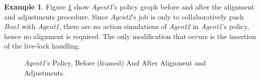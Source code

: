 \documentclass[letterpaper]{article}
\theoremstyle{definition}
\newtheorem{example}{Example}
\newcommand{\eliran}[1]{\textbf{[\color{red}ELIRAN:#1]}}
\newcommand{\ronen}[1]{\textbf{[\color{blue}RONEN:#1]}}
\begin{document}
\begin{example}
Figure \ref{Fig:Alignment}
show \emph{Agent1}'s policy graph before and after the alignment and adjustments procedure.
Since \emph{Agent2}'s job is only to collaboratively push \emph{Box1} with \emph{Agent1}, there are no action simulations of \emph{Agent2} in \emph{Agent1}'s policy, hence no alignment is required. The only modification that occurs is the insertion of the live-lock handling.



\begin{figure}
    \centering
\caption{\label{Fig:Alignment} \emph{Agent1}'s Policy, Before (framed) And After Alignment and Adjustments.}
\end{figure}
\end{example}
\end{document}
